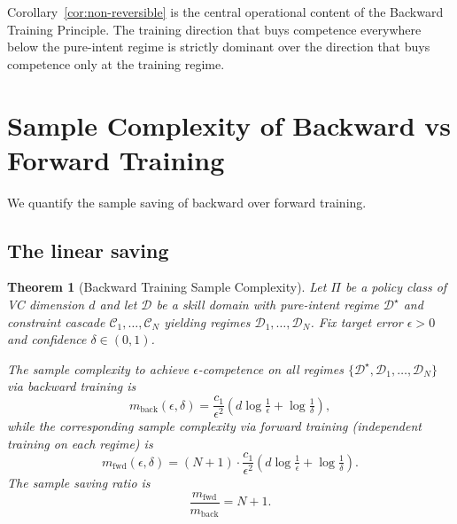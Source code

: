 \documentclass[twocolumn,11pt,a4paper]{article}
\newtheorem{theorem}{Theorem}[section]
\newcommand{\cD}{\mathcal{D}}
\newcommand{\cC}{\mathcal{C}}
\begin{document}
Corollary~\ref{cor:non-reversible} is the central operational content of the Backward Training Principle. The training direction that buys competence everywhere below the pure-intent regime is strictly dominant over the direction that buys competence only at the training regime.


\section{Sample Complexity of Backward vs Forward Training}
\label{sec:sample-complexity}

We quantify the sample saving of backward over forward training.

\subsection{The linear saving}

\begin{theorem}[Backward Training Sample Complexity]
\label{thm:sample-complexity}
Let $\Pi$ be a policy class of VC dimension $d$ and let $\cD$ be a skill domain with pure-intent regime $\cD^\star$ and constraint cascade $\cC_1, \ldots, \cC_N$ yielding regimes $\cD_1, \ldots, \cD_N$. Fix target error $\epsilon > 0$ and confidence $\delta \in (0, 1)$.

The sample complexity to achieve $\epsilon$-competence on all regimes $\{\cD^\star, \cD_1, \ldots, \cD_N\}$ via backward training is
\begin{equation}
m_{\mathrm{back}}(\epsilon, \delta) = \frac{c_1}{\epsilon^2}\left(d \log\tfrac{1}{\epsilon} + \log\tfrac{1}{\delta}\right),
\end{equation}
while the corresponding sample complexity via forward training (independent training on each regime) is
\begin{equation}
m_{\mathrm{fwd}}(\epsilon, \delta) = (N+1) \cdot \frac{c_1}{\epsilon^2}\left(d \log\tfrac{1}{\epsilon} + \log\tfrac{1}{\delta}\right).
\end{equation}
The sample saving ratio is
\begin{equation}
\frac{m_{\mathrm{fwd}}}{m_{\mathrm{back}}} = N + 1.
\end{equation}
\end{theorem}
\end{document}
